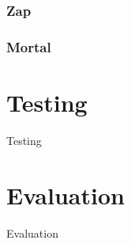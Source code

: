 \documentclass[12pt]{article}
\begin{document}
\subsubsection{Zap}
\subsubsection{Mortal}

\section{Testing}
Testing
\section{Evaluation}
Evaluation
 
\end{document}

